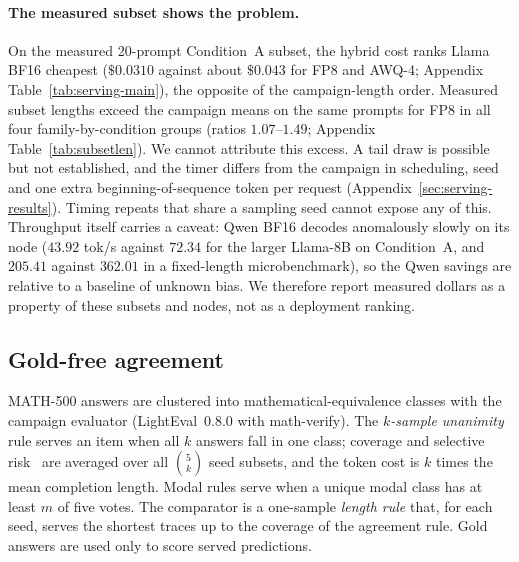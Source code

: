 \documentclass[11pt,a4paper]{article}
\begin{document}
\paragraph{The measured subset shows the problem.} On the measured 20-prompt Condition~A subset, the hybrid cost ranks Llama BF16 cheapest ($\$0.0310$ against about $\$0.043$ for FP8 and AWQ-4; Appendix Table~\ref{tab:serving-main}), the opposite of the campaign-length order. Measured subset lengths exceed the campaign means on the same prompts for FP8 in all four family-by-condition groups (ratios $1.07$--$1.49$; Appendix Table~\ref{tab:subsetlen}). We cannot attribute this excess. A tail draw is possible but not established, and the timer differs from the campaign in scheduling, seed and one extra beginning-of-sequence token per request (Appendix~\ref{sec:serving-results}). Timing repeats that share a sampling seed cannot expose any of this. Throughput itself carries a caveat: Qwen BF16 decodes anomalously slowly on its node ($43.92$ tok/s against $72.34$ for the larger Llama-8B on Condition~A, and $205.41$ against $362.01$ in a fixed-length microbenchmark), so the Qwen savings are relative to a baseline of unknown bias. We therefore report measured dollars as a property of these subsets and nodes, not as a deployment ranking.

\subsection{Gold-free agreement}
\label{sec:modal-def}
MATH-500 answers are clustered into mathematical-equivalence classes with the campaign evaluator (LightEval~0.8.0 with math-verify). The \emph{$k$-sample unanimity} rule serves an item when all $k$ answers fall in one class; coverage and selective risk~\cite{geifman2017selective} are averaged over all $\binom{5}{k}$ seed subsets, and the token cost is $k$ times the mean completion length. Modal rules serve when a unique modal class has at least $m$ of five votes. The comparator is a one-sample \emph{length rule} that, for each seed, serves the shortest traces up to the coverage of the agreement rule. Gold answers are used only to score served predictions.
\end{document}
